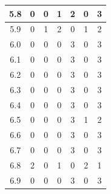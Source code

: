 \documentclass[11pt]{jreport}
\begin{document}
\begin{table}
{\begin{tabular}{c|c|c|c|c|c|c}
    \hline
    5.8 & 0 & 0 & 1 & 2 & 0 & 3 \\
    \hline
    5.9 & 0 & 1 & 2 & 0 & 1 & 2 \\
    \hline
    6.0 & 0 & 0 & 0 & 3 & 0 & 3 \\
    \hline
    6.1 & 0 & 0 & 0 & 3 & 0 & 3 \\
    \hline
    6.2 & 0 & 0 & 0 & 3 & 0 & 3 \\
    \hline
    6.3 & 0 & 0 & 0 & 3 & 0 & 3 \\
    \hline
    6.4 & 0 & 0 & 0 & 3 & 0 & 3 \\
    \hline
    6.5 & 0 & 0 & 0 & 3 & 1 & 2 \\
    \hline
    6.6 & 0 & 0 & 0 & 3 & 0 & 3 \\
    \hline
    6.7 & 0 & 0 & 0 & 3 & 0 & 3 \\
    \hline
    6.8 & 2 & 0 & 1 & 0 & 2 & 1 \\
    \hline
    6.9 & 0 & 0 & 0 & 3 & 0 & 3 \\
    \hline
    \end{tabular}
    }
\end{table}          
\end{document}
